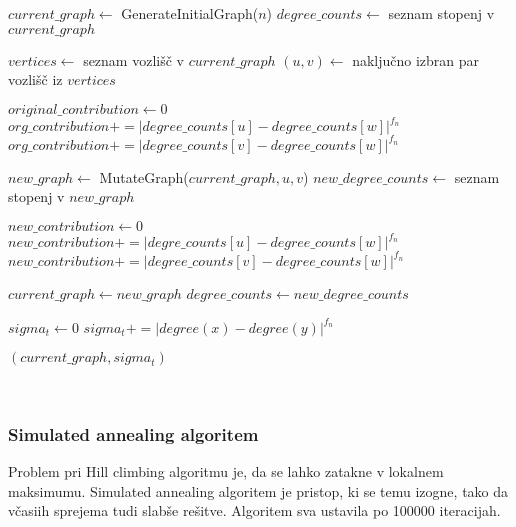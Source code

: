 \documentclass{article}
\begin{document}
    \begin{algorithmic}[1]
    
        \State $current\_graph \gets$ GenerateInitialGraph($n$)
        \State $degree\_counts \gets$ seznam stopenj v $current\_graph$
    
            \State $vertices \gets$ seznam vozlišč v $current\_graph$
            \State $(u, v) \gets$ naključno izbran par vozlišč iz $vertices$
            
            \State $original\_contribution \gets 0$
                    \State $org\_contribution += |degree\_counts[u] - degree\_counts[w]|^{f_n}$
                \EndIf
                    \State $org\_contribution += |degree\_counts[v] - degree\_counts[w]|^{f_n}$
                \EndIf
            \EndFor
    
            \State $new\_graph \gets$ MutateGraph($current\_graph, u, v$)
            \State $new\_degree\_counts \gets$ seznam stopenj v $new\_graph$
    
            \State $new\_contribution \gets 0$
                    \State $new\_contribution += |degre\_counts[u] - degree\_counts[w]|^{f_n}$
                \EndIf
                    \State $new\_contribution += |degree\_counts[v] - degree\_counts[w]|^{f_n}$
                \EndIf
            \EndFor
    
                \State $current\_graph \gets new\_graph$
                \State $degree\_counts \gets new\_degree\_counts$
            \EndIf
        \EndFor
    
        \State $sigma_t \gets 0$
            \State $sigma_t += |degree(x) - degree(y)|^{f_n}$
        \EndFor
    
        \State \Return $(current\_graph, sigma_t)$
    \EndFunction 
    
    \end{algorithmic}
    
\\

\subsubsection*{Simulated annealing algoritem}
Problem pri Hill climbing algoritmu je, da se lahko zatakne v lokalnem 
maksimumu. Simulated annealing algoritem je pristop, ki se temu izogne,
tako da včasiih sprejema tudi slabše rešitve. Algoritem sva ustavila po
100000 iteracijah.
\end{document}
